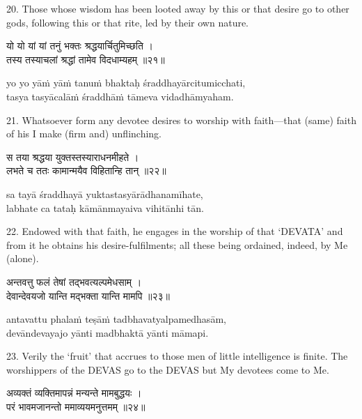 20. Those whose wisdom has been looted away by this or that desire go to other
gods, following this or that rite, led by their own nature.

\begin{gitaverse}
यो यो यां यां तनुं भक्तः श्रद्धयार्चितुमिच्छति । \\
तस्य तस्याचलां श्रद्धां तामेव विदधाम्यहम् ॥२१॥
\end{gitaverse}

\begin{transliteration}
yo yo yāṁ yāṁ tanuṁ bhaktaḥ śraddhayārcitumicchati, \\
tasya tasyācalāṁ śraddhāṁ tāmeva vidadhāmyaham.
\end{transliteration}

21. Whatsoever form any devotee desires to worship with faith---that (same)
faith of his I make (firm and) unflinching.

\begin{gitaverse}
स तया श्रद्धया युक्तस्तस्याराधनमीहते । \\
लभते च ततः कामान्मयैव विहितान्हि तान् ॥२२॥
\end{gitaverse}

\begin{transliteration}
sa tayā śraddhayā yuktastasyārādhanamīhate, \\
labhate ca tataḥ kāmānmayaiva vihitānhi tān.
\end{transliteration}

22. Endowed with that faith, he engages in the worship of that `DEVATA' and
from it he obtains his desire-fulfilments; all these being ordained, indeed, by
Me (alone).

\begin{gitaverse}
अन्तवत्तु फलं तेषां तद्भवत्यल्पमेधसाम् । \\
देवान्देवयजो यान्ति मद्भक्ता यान्ति मामपि ॥२३॥
\end{gitaverse}

\begin{transliteration}
antavattu phalaṁ teṣāṁ tadbhavatyalpamedhasām, \\
devāndevayajo yānti madbhaktā yānti māmapi.
\end{transliteration}

23. Verily the `fruit' that accrues to those men of little intelligence is
finite. The worshippers of the DEVAS go to the DEVAS but My devotees come to
Me.

\begin{gitaverse}
अव्यक्तं व्यक्तिमापन्नं मन्यन्ते मामबुद्धयः । \\
परं भावमजानन्तो ममाव्ययमनुत्तमम् ॥२४॥
\end{gitaverse}

